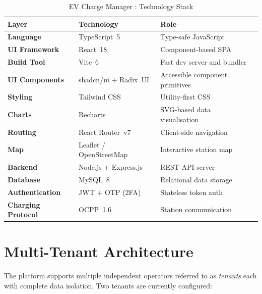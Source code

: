 \documentclass[12pt,a4paper]{report}
\begin{document}
\begin{table}[h!]
  \centering
  \caption{EV Charge Manager : Technology Stack}
  \label{tab:tech-stack}
  \renewcommand{\arraystretch}{1.3}
  \begin{tabular}{|>{\bfseries}p{3.8cm}|p{4cm}|p{5.5cm}|}
    \hline
    Layer              & Technology            & Role \\ \hline
    Language           & TypeScript~5          & Type-safe JavaScript~\autocite{typescript_docs} \\ \hline
    UI Framework       & React~18              & Component-based SPA~\autocite{react_docs} \\ \hline
    Build Tool         & Vite~6                & Fast dev server and bundler~\autocite{vite_docs} \\ \hline
    UI Components      & shadcn/ui + Radix~UI  & Accessible component primitives \\ \hline
    Styling            & Tailwind CSS          & Utility-first CSS~\autocite{tailwindcss_docs} \\ \hline
    Charts             & Recharts              & SVG-based data visualisation~\autocite{recharts_docs} \\ \hline
    Routing            & React Router~v7       & Client-side navigation~\autocite{reactrouter_docs} \\ \hline
    Map                & Leaflet / OpenStreetMap & Interactive station map \\ \hline
    Backend            & Node.js + Express.js  & REST API server~\autocite{nodejs_express} \\ \hline
    Database           & MySQL~8               & Relational data storage~\autocite{mysql_docs} \\ \hline
    Authentication     & JWT + OTP (2FA)       & Stateless token auth~\autocite{rfc7519} \\ \hline
    Charging Protocol  & OCPP~1.6              & Station communication~\autocite{ocpp16_ed2} \\ \hline
  \end{tabular}
\end{table}

\section{Multi-Tenant Architecture}

The platform supports multiple independent operators referred to as \textit{tenants} each
with complete data isolation. Two tenants are currently configured:
\end{document}
